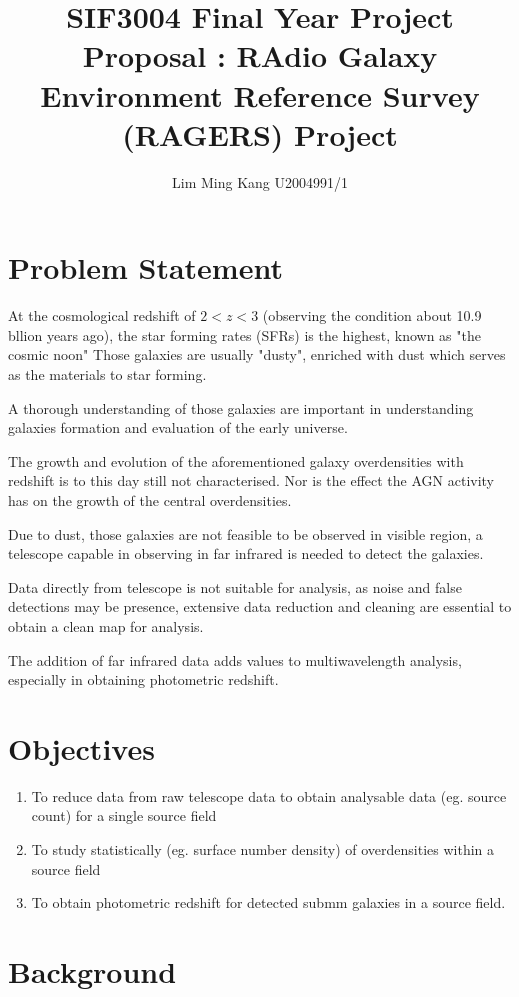 \documentclass{article}
\title{SIF3004 Final Year Project Proposal : RAdio Galaxy Environment Reference Survey (RAGERS) Project }
\author{Lim Ming Kang U2004991/1}
\begin{document}
\maketitle
\section{Problem Statement}

At the cosmological redshift of $2 < z < 3$ (observing the condition about 10.9 bllion years ago), the star forming rates (SFRs) is the highest, known as "the cosmic noon"
Those galaxies are usually "dusty", enriched with dust which serves as the materials to star forming.
\medskip

\noindent A thorough understanding of those galaxies are important in understanding galaxies formation and evaluation of the early universe.
\medskip

\noindent The growth and evolution of the aforementioned galaxy overdensities with redshift is to this day still not characterised. Nor is the effect the AGN activity has on the growth of the central overdensities.
\medskip

\noindent Due to dust, those galaxies are not feasible to be observed in visible region, a telescope capable in observing in far infrared is needed to detect the galaxies.
\medskip

\noindent Data directly from telescope is not suitable for analysis, as noise and false detections may be presence, extensive data reduction and cleaning are essential to obtain a clean map for analysis. 
\medskip

\noindent The addition of far infrared data adds values to multiwavelength analysis, especially in obtaining photometric redshift.

\section{Objectives}
\begin{enumerate}
    \item To reduce data from raw telescope data to obtain analysable data (eg. source count) for a single source field
    \item To study statistically (eg. surface number density) of overdensities within a source field
    \item To obtain photometric redshift for detected submm galaxies in a source field.
\end{enumerate}
\section{Background}
\end{document}
